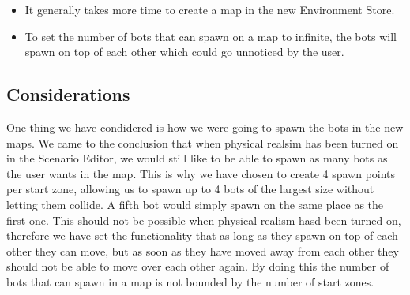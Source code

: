 \begin{itemize}
	\item It generally takes more time to create a map in the new Environment Store.
	\item To set the number of bots that can spawn on a map to infinite, the bots will spawn on top of each other which could go unnoticed by the user.
\end{itemize}


\subsection{Considerations}
One thing we have condidered is how we were going to spawn the bots in the new maps. We came to the conclusion that when physical realsim has been turned
on in the Scenario Editor, we would still like to be able to spawn as many bots as the user wants in the map. This is why we have chosen to create 4 spawn points per
start zone, allowing us to spawn up to 4 bots of the largest size without letting them collide. A fifth bot would simply spawn on the same place as the first one. This should
not be possible when physical realism hasd been turned on, therefore we have set the functionality that as long as they spawn on top of each other they can move, but as soon as
they have moved away from each other they should not be able to move over each other again. By doing this the number of bots that can spawn in a map is not bounded by the number
of start zones.